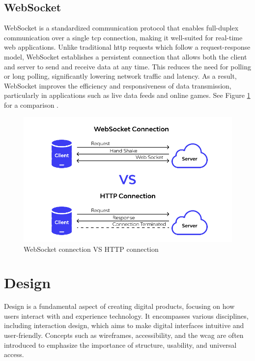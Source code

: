 \subsection*{WebSocket}
\label{subsubsec:websocket}

WebSocket is a standardized communication protocol that enables full-duplex communication over a single \gls{tcp} connection, making it well-suited for real-time web applications. Unlike traditional \gls{http} requests which follow a request-response model, WebSocket establishes a persistent connection that allows both the client and server to send and receive data at any time. This reduces the need for polling or long polling, significantly lowering network traffic and latency. As a result, WebSocket improves the efficiency and responsiveness of data transmission, particularly in applications such as live data feeds and online games. See Figure \ref{fig:websocket-vs-http} for a comparison \cite{nodejs:websocket, apidog:websocket}.


\begin{figure}[h!]
    \centering
    \includegraphics[width=0.75\linewidth]{figures/theory/websocket-vs-http.png}
    \caption[WebSocket connection VS HTTP connection]{WebSocket connection VS HTTP connection \cite{apidog:websocket}}
    \label{fig:websocket-vs-http}
\end{figure}

\section{Design}
\label{sec:design}

Design is a fundamental aspect of creating digital products, focusing on how users interact with and experience technology. It encompasses various disciplines, including interaction design, which aims to make digital interfaces intuitive and user-friendly. Concepts such as wireframes, accessibility, and the \gls{wcag} are often introduced to emphasize the importance of structure, usability, and universal access. \\


